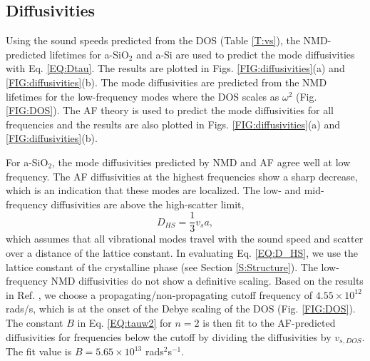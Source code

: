 \documentclass[aps,prb,twocolumn,superscriptaddress,footinbib,amsmath,amssymb,floatfix]{revtex4}
\begin{document}
\subsection{\label{S:Diffusivities}Diffusivities}

Using the sound speeds predicted 
from the DOS (Table \ref{T:vs}), the NMD-predicted lifetimes 
for a-SiO$_2$ and a-Si are used to predict the mode diffusivities with 
Eq. \eqref{EQ:Dtau}. The results are plotted in 
Figs. \ref{FIG:diffusivities}(a) and \ref{FIG:diffusivities}(b).  
The mode diffusivities are predicted from the NMD lifetimes for the 
low-frequency modes where the DOS scales as $\omega^2$ 
(Fig. \ref{FIG:DOS}). The AF theory is used to predict the mode 
diffusivities for all frequencies and the results are also plotted in 
Figs. \ref{FIG:diffusivities}(a) and \ref{FIG:diffusivities}(b). 

For a-SiO$_2$, the mode diffusivities predicted by NMD and AF agree 
well at low frequency. The AF diffusivities at 
the highest frequencies show a sharp decrease, which is an indication 
that these modes are localized.\cite{feldman_thermal_1993} 
The low- and mid-frequency diffusivities are above the 
high-scatter limit, 
\begin{equation}\label{EQ:D_HS}
D_{HS} = \frac{1}{3} v_s a,
\end{equation}
which assumes that all vibrational modes travel with the sound speed  
and scatter over a distance of the lattice constant.
\cite{cahill_lattice_1988} In evaluating Eq. \eqref{EQ:D_HS}, 
we use the lattice constant of the 
crystalline phase (see Section \ref{S:Structure}). The low-frequency 
NMD diffusivities do not show a 
definitive scaling. Based on the results in 
Ref. , we choose a 
propagating/non-propagating cutoff frequency of 
$4.55\times10^{12}$ rads/s, which is at the onset 
of the Debye scaling of the DOS (Fig. \ref{FIG:DOS}). 
The constant $B$ in Eq. \eqref{EQ:tauw2} for $n=2$ 
is then fit to the AF-predicted diffusivities for 
frequencies below the cutoff by dividing the diffusivities 
by $v_{s,DOS}$. The fit value is $B=5.65\times10^{13}$ 
rads$^2$s$^{-1}$.
\end{document}
